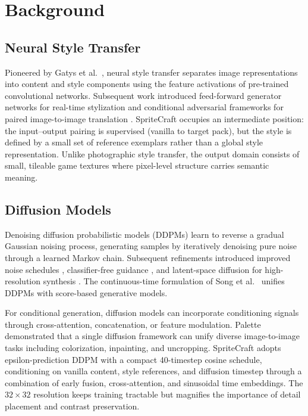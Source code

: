\chapter{Background}
\label{chap:background}

\section{Neural Style Transfer}

Pioneered by Gatys et al.~\citep{gatys2016image}, neural style transfer separates image representations into content and style components using the feature activations of pre-trained convolutional networks. Subsequent work introduced feed-forward generator networks for real-time stylization \citep{johnson2016perceptual} and conditional adversarial frameworks for paired image-to-image translation \citep{isola2017image}. SpriteCraft occupies an intermediate position: the input--output pairing is supervised (vanilla to target pack), but the style is defined by a small set of reference exemplars rather than a global style representation. Unlike photographic style transfer, the output domain consists of small, tileable game textures where pixel-level structure carries semantic meaning.

\section{Diffusion Models}

Denoising diffusion probabilistic models (DDPMs) \citep{ho2020denoising} learn to reverse a gradual Gaussian noising process, generating samples by iteratively denoising pure noise through a learned Markov chain. Subsequent refinements introduced improved noise schedules \citep{nichol2021improved}, classifier-free guidance \citep{dhariwal2021diffusion}, and latent-space diffusion for high-resolution synthesis \citep{rombach2022high}. The continuous-time formulation of Song et al.~\citep{song2021scorebased} unifies DDPMs with score-based generative models.

For conditional generation, diffusion models can incorporate conditioning signals through cross-attention, concatenation, or feature modulation. Palette \citep{saharia2022palette} demonstrated that a single diffusion framework can unify diverse image-to-image tasks including colorization, inpainting, and uncropping. SpriteCraft adopts epsilon-prediction DDPM with a compact 40-timestep cosine schedule, conditioning on vanilla content, style references, and diffusion timestep through a combination of early fusion, cross-attention, and sinusoidal time embeddings. The $32\times32$ resolution keeps training tractable but magnifies the importance of detail placement and contrast preservation.

